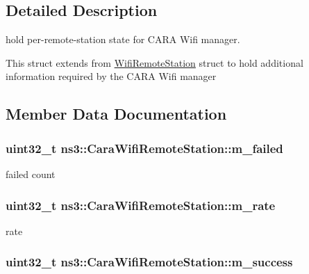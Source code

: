 \subsection{Detailed Description}
hold per-\/remote-\/station state for C\+A\+RA Wifi manager. 

This struct extends from \hyperlink{structns3_1_1WifiRemoteStation}{Wifi\+Remote\+Station} struct to hold additional information required by the C\+A\+RA Wifi manager 

\subsection{Member Data Documentation}
\subsubsection[{\texorpdfstring{m\+\_\+failed}{m_failed}}]{\setlength{\rightskip}{0pt plus 5cm}uint32\+\_\+t ns3\+::\+Cara\+Wifi\+Remote\+Station\+::m\+\_\+failed}\hypertarget{structns3_1_1CaraWifiRemoteStation_a2daae56271c3a1d81eb2bf55718f617b}{}\label{structns3_1_1CaraWifiRemoteStation_a2daae56271c3a1d81eb2bf55718f617b}


failed count 

\subsubsection[{\texorpdfstring{m\+\_\+rate}{m_rate}}]{\setlength{\rightskip}{0pt plus 5cm}uint32\+\_\+t ns3\+::\+Cara\+Wifi\+Remote\+Station\+::m\+\_\+rate}\hypertarget{structns3_1_1CaraWifiRemoteStation_a659ebf2a1fd8aded15cd7e9e5a8e1f2e}{}\label{structns3_1_1CaraWifiRemoteStation_a659ebf2a1fd8aded15cd7e9e5a8e1f2e}


rate 

\subsubsection[{\texorpdfstring{m\+\_\+success}{m_success}}]{\setlength{\rightskip}{0pt plus 5cm}uint32\+\_\+t ns3\+::\+Cara\+Wifi\+Remote\+Station\+::m\+\_\+success}\hypertarget{structns3_1_1CaraWifiRemoteStation_a09ea9a9a8b4a529c025da82895078128}{}\label{structns3_1_1CaraWifiRemoteStation_a09ea9a9a8b4a529c025da82895078128}


